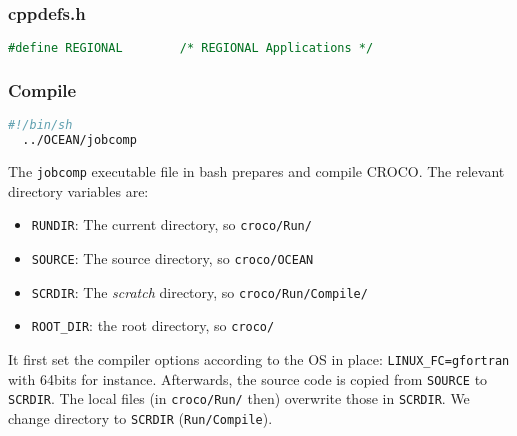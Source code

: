 \message{ !name(croco.tex)}\documentclass{article}
\begin{document}
\subsubsection{cppdefs.h}
\begin{lstlisting}[language=Fortran]
#define REGIONAL        /* REGIONAL Applications */
\end{lstlisting}


\subsubsection{Compile}
\begin{lstlisting}[language=bash]
  #!/bin/sh
  ../OCEAN/jobcomp
\end{lstlisting}
The \texttt{jobcomp} executable file in bash prepares and compile CROCO.
The relevant directory variables are:
\begin{itemize}
\item \texttt{RUNDIR}: The current directory, so \texttt{croco/Run/}
\item \texttt{SOURCE}: The source directory, so \texttt{croco/OCEAN}
\item \texttt{SCRDIR}: The \emph{scratch} directory, so \texttt{croco/Run/Compile/}
\item \texttt{ROOT\_DIR}: the root directory, so \texttt{croco/}
\end{itemize}
It first set the compiler options according to the OS in place: \texttt{LINUX\_FC=gfortran} with 64bits for instance.
Afterwards, the source code is copied from \texttt{SOURCE} to \texttt{SCRDIR}.
The local files (in \texttt{croco/Run/} then) overwrite those in \texttt{SCRDIR}.
We change directory to \texttt{SCRDIR} (\texttt{Run/Compile}).
\end{document}

